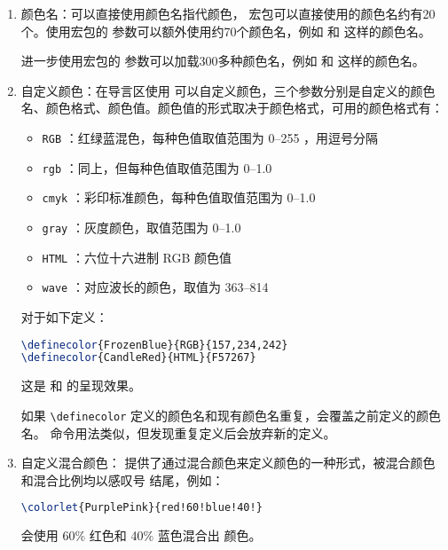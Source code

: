 \begin{enumerate}
\item 颜色名：可以直接使用颜色名指代颜色， 宏包可以直接使用的颜色名约有20个。使用宏包的 \boxforcmd{[dvipsnames]} 参数可以额外使用约70个颜色名，例如 和 这样的颜色名。

进一步使用宏包的 \boxforcmd{[x11names]} 参数可以加载300多种颜色名，例如 和 这样的颜色名。

\item 自定义颜色：在导言区使用 \boxforcmd{\\definecolor{}{}{}} 可以自定义颜色，三个参数分别是自定义的颜色名、颜色格式、颜色值。颜色值的形式取决于颜色格式，可用的颜色格式有：

\begin{itemize}[itemsep=0pt]
    \item \verb|RGB| ：红绿蓝混色，每种色值取值范围为 0--255 ，用逗号分隔
    \item \verb|rgb| ：同上，但每种色值取值范围为 0--1.0
    \item \verb|cmyk| ：彩印标准颜色，每种色值取值范围为 0--1.0
    \item \verb|gray| ：灰度颜色，取值范围为 0--1.0
    \item \verb|HTML| ：六位十六进制 RGB 颜色值
    \item \verb|wave| ：对应波长的颜色，取值为 363--814 
\end{itemize}

对于如下定义：

\begin{tcolorbox}[colback=white]
\begin{lstlisting}[language=TeX]
\definecolor{FrozenBlue}{RGB}{157,234,242}
\definecolor{CandleRed}{HTML}{F57267}
\end{lstlisting}
\end{tcolorbox}

这是 和 的呈现效果。

如果 \verb|\definecolor| 定义的颜色名和现有颜色名重复，会覆盖之前定义的颜色名。\boxforcmd{\\providecolor} 命令用法类似，但发现重复定义后会放弃新的定义。

\item 自定义混合颜色： 提供了通过混合颜色来定义颜色的一种形式，被混合颜色和混合比例均以感叹号 \boxforcmd{!} 结尾，例如：

\begin{lstlisting}[language=TeX]
\colorlet{PurplePink}{red!60!blue!40!}
\end{lstlisting}

会使用 60\% 红色和 40\% 蓝色混合出 颜色。

\end{enumerate}
